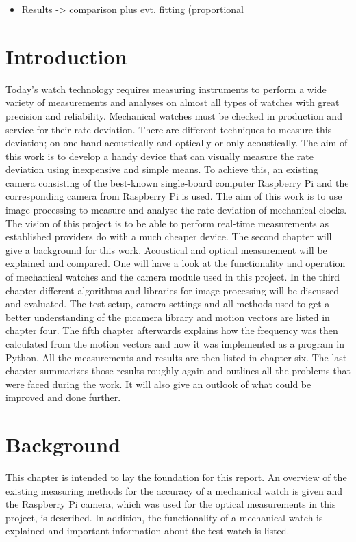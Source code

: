 \documentclass[12pt, a4paper]{report}
\begin{document}
\begin{itemize}
\item Results -> comparison plus evt. fitting (proportional 
\end{itemize}
\pagebreak
    \setcounter{secnumdepth}{5} 
    \setcounter{tocdepth}{5} 
    \tableofcontents
    \pagebreak
    
    \chapter{Introduction}
    Today's watch technology requires measuring instruments to perform a wide variety of measurements and analyses on almost all types of watches with great precision and reliability.
    Mechanical watches must be checked in production and service for their rate deviation.
    There are different techniques to measure this deviation; on one hand acoustically and optically or only acoustically.
    The aim of this work is to develop a handy device that can visually measure the rate deviation using inexpensive and simple means.
    To achieve this, an existing camera consisting of the best-known single-board computer Raspberry Pi and the corresponding camera from Raspberry Pi is used.
    The aim of this work is to use image processing to measure and analyse the rate deviation of mechanical clocks.
    The vision of this project is to be able to perform real-time measurements as established providers do with a much cheaper device. 
    \newline
    The second chapter will give a background for this work. Acoustical and optical measurement will be explained and compared. One will have a look at the functionality and operation of mechanical watches and the camera module used in this project.
    In the third chapter different algorithms and libraries for image processing will be discussed and evaluated. 
    The test setup, camera settings and all methods used to get a better understanding of the picamera library and motion vectors are listed in chapter four. 
    The fifth chapter afterwards explains how the frequency was then calculated from the motion vectors and how it was implemented as a program in Python. 
    All the measurements and results are then listed in chapter six. 
    The last chapter summarizes those results roughly again and outlines all the problems that were faced during the work. It will also give an outlook of what could be improved and done further.

    \chapter{Background}
    This chapter is intended to lay the foundation for this report. An overview of the existing measuring methods for the accuracy of a mechanical watch is given and the Raspberry Pi camera, which was used for the optical measurements in this project, is described. In addition, the functionality of a mechanical watch is explained and important information about the test watch is listed.
\end{document}
